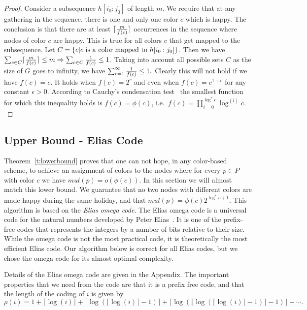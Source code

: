 \documentclass[11pt]{article}
\begin{document}
\begin{proof}
Consider a subsequence $h[i_0:j_0]$ of length $m$.
We require that at any gathering in the sequence, there is one
and only one color $c$ which is happy. The conclusion
is that there are at least $\lceil {m \over f(c)} \rceil$ occurrences in
the sequence where nodes of color $c$ are happy. This is true for all
colors $c$ that get mapped to the subsequence. Let $C = \{ c | c {\rm
  \ is\ a\ color\ mapped\ to\ }h[i_0:j_0]\}$. Then we have
$\sum_{c\in C} \lceil {m\over f(c)} \rceil \leq m\Rightarrow \sum_{c\in C} {1\over f(c)} \leq 1.$
Taking into account all possible sets $C$ as the size of $G$ goes to infinity, we have
$\sum_{c=1}^{\infty} {1\over f(c)} \leq 1.$
Clearly this will not hold if we have $f(c)=c$. It
holds when $f(c)=2^c$ and even when $f(c)=c^{1+\epsilon}$ for any constant $\epsilon >0$. According
to Cauchy's condensation test~\cite{bkk:06} the smallest function for
which this inequality holds is $f(c) = {\phi(c)}$, i.e.\
$f(c)=\prod_{i=0}^{\log^*c} \log^{(i)}c.$
\end{proof}



\subsection{Upper Bound - Elias Code}\label{ss:elias}

Theorem~\ref{t:lowerbound} proves that one can not hope, in any
color-based scheme, to achieve an assignment of colors to the nodes where for every $p\in P$ with color $c$ we have $mul(p) = o(\phi(c))$.
In this section we will almost match this lower bound. We guarantee that no two nodes with
different colors are made happy during the same holiday, and that $mul(p)=
\phi(c) 2^{\log^* c+1}$. This algorithm is based on the {\em Elias omega
  code}. The Elias omega code is a universal code for the natural numbers
developed by Peter Elias~\cite{Elias75}. It is one of the prefix-free
codes that represents the integers by a number of bits relative to their
size. While the omega code is not the most practical code,
it is theoretically the most efficient Elias code. Our algorithm below
is correct for all Elias codes, but we chose the omega code for its
almost optimal complexity.

Details of the Elias omega code are given in the Appendix. The important properties that we need from the code are that it is a prefix free code, and that the length of the coding of $i$ is given by $$\rho(i)= 1+ \lceil \log(i) \rceil + \lceil
  \log(\lceil \log(i) \rceil -1) \rceil + \lceil \log(\lceil
  \log(\lceil \log(i) \rceil -1) \rceil - 1) \rceil + \cdots.$$
\end{document}
